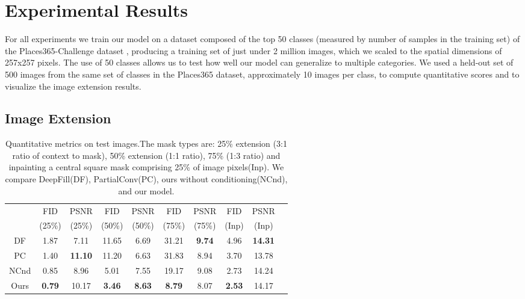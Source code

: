 \section{Experimental Results}
\label{sec:results}
For all experiments we train our model on a dataset composed of the top 50 classes (measured by number of samples in the training set) of the Places365-Challenge dataset \cite{zhou2017places}, producing a training set of just under 2 million images, which we scaled to the spatial dimensions of 257x257 pixels. The use of 50 classes allows us to test how well our model can generalize to multiple categories. We used a held-out set of 500 images from the same set of classes in the Places365 dataset, approximately 10 images per class, to compute quantitative scores and to visualize the image extension results.

\subsection{Image Extension}
\label{subsec:extension}

\begin{table}[tp]
\small
\setlength{\tabcolsep}{2pt}
\centering
\begin{tabular}{|c|c|c|c|c|c|c|c|c|c|}
\hline
  & FID & PSNR & FID & PSNR & FID & PSNR & FID & PSNR\\
& (25\%) & (25\%) & (50\%) & (50\%) & (75\%) & (75\%) & (Inp) & (Inp) \\
\hline
\hline
DF & 1.87 & 7.11 & 11.65 & 6.69 & 31.21 & \textbf{9.74} & 4.96 & \textbf{14.31} \\
PC & 1.40 & \textbf{11.10} & 11.20 & 6.63 & 31.83 & 8.94 & 3.70 & 13.78 \\
NCnd & 0.85 &  8.96 & 5.01 & 7.55 & 19.17 & 9.08 & 2.73 & 14.24 \\
Ours & \textbf{0.79} & 10.17 & \textbf{3.46} & \textbf{8.63} & \textbf{8.79} & 8.07 & \textbf{2.53} & 14.17 \\
\hline
\end{tabular}
\vspace{4pt}
\caption{Quantitative metrics on  test images.The mask types are: 25\% extension (3:1 ratio of context to mask), 50\% extension (1:1 ratio), 75\% (1:3 ratio) and inpainting a central square mask comprising 25\% of image pixels(Inp). We compare DeepFill(DF), PartialConv(PC), ours without conditioning(NCnd), and our model.}
\label{exp:table_all}
\end{table}

